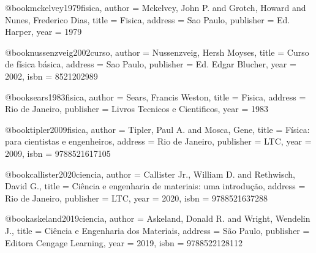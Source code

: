 @book{mckelvey1979fisica,
  author = {Mckelvey, John P. and Grotch, Howard and Nunes, Frederico Dias},
  title = {Fisica},
  address = {Sao Paulo},
  publisher = {Ed. Harper},
  year = {1979}
}

@book{nussenzveig2002curso,
  author = {Nussenzveig, Hersh Moyses},
  title = {Curso de física básica},
  address = {Sao Paulo},
  publisher = {Ed. Edgar Blucher},
  year = {2002},
  isbn = {8521202989}%
}

@book{sears1983fisica,
  author = {Sears, Francis Weston},
  title = {Fisica},
  address = {Rio de Janeiro},
  publisher = {Livros Tecnicos e Cientificos},
  year = {1983}%
}

@book{tipler2009fisica,
  author = {Tipler, Paul A. and Mosca, Gene},
  title = {Física: para cientistas e engenheiros},
  address = {Rio de Janeiro},
  publisher = {LTC},
  year = {2009},
  isbn = {9788521617105}%
}

%

@book{callister2020ciencia,
  author = {Callister Jr., William D. and Rethwisch, David G.},
  title = {Ciência e engenharia de materiais: uma introdução},
  address = {Rio de Janeiro},
  publisher = {LTC},
  year = {2020},
  isbn = {9788521637288}
}

@book{askeland2019ciencia,
  author = {Askeland, Donald R. and Wright, Wendelin J.},
  title = {Ciência e Engenharia dos Materiais},
  address = {São Paulo},
  publisher = {Editora Cengage Learning},
  year = {2019},
  isbn = {9788522128112}
}

